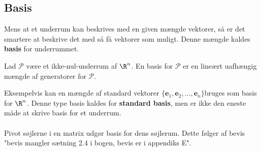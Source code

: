 \subsection{Basis}
Mens at et underrum kan beskrives med en given mængde vektorer, så er det smartere at beskrive det med så få vektorer som muligt. Denne mængde kaldes \textbf{basis} for underrummet.
\begin{defn}{}{}
Lad $\mathcal{P}$ være et ikke-nul-underrum af $\R^n$. En basis for $\mathcal{P}$ er en lineært uafhængig mængde af generatorer for $\mathcal{P}$.
\end{defn}
\noindent
Eksempelvis kan en mængde af standard vektorer $\{\textbf{e}_1,\textbf{e}_2,\ldots,\textbf{e}_n\}$bruges som basis for $\R^n$.
Denne type basis kaldes for \textbf{standard basis}, men er ikke den eneste måde at skrive basis for et underrum.\\\\
Pivot søjlerne i en matrix udgør basis for dens søjlerum. Dette følger af bevis "bevis mangler sætning 2.4 i bogen, bevis er i appendiks E".
\\\\





